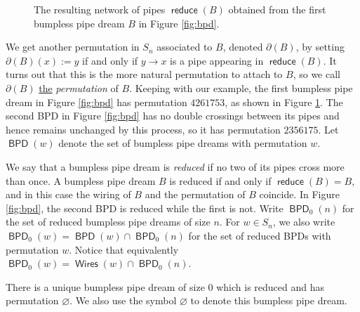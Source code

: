\documentclass[11pt]{article}
\makeatletter
\theoremstyle{definition}
\numberwithin{equation}{section}
\DeclareMathOperator{\reduce}{\mathsf{reduce}}
\DeclareMathOperator{\Wires}{\mathsf{Wires}}
\DeclareMathOperator{\BPD}{\mathsf{BPD}}
\newcommand{\pipecolor}{UForange}
\newcommand{\drawHorizontal}[2]{
    \draw[color=\pipecolor,very thick]
    (#1-0.5,#2) to (#1+0.5,#2);
}
\newcommand{\drawVertical}[2]{
    \draw[color=\pipecolor,very thick]
    (#1,#2-0.5) to (#1,#2+0.5);
}
\newcommand{\drawCross}[2]{
    \drawHorizontal{#1}{#2}
    \drawVertical{#1}{#2}
}
\newcommand{\drawRelbow}[2]{
    \draw[color=\pipecolor,very thick]
    (#1,#2-0.5) to (#1,#2-0.25) to[bend left] (#1+0.25,#2) to (#1+0.5,#2);
}
\newcommand{\drawJelbow}[2]{
    \draw[color=\pipecolor,very thick]
    (#1,#2+0.5) to (#1,#2+0.25) to[bend left] (#1-0.25,#2) to (#1-0.5,#2);
}
\newcommand{\drawBump}[2]{
    \drawRelbow{#1}{#2}
    \drawJelbow{#1}{#2}
}
\newcommand{\drawBPDTile}[3]{
    \ifnum #3=1 \drawVertical{#1}{#2}   \fi
    \ifnum #3=2 \drawHorizontal{#1}{#2} \fi
    \ifnum #3=3 \drawCross{#1}{#2}      \fi
    \ifnum #3=4 \drawRelbow{#1}{#2}     \fi
    \ifnum #3=5 \drawJelbow{#1}{#2}     \fi
    \ifnum #3=6 \drawBump{#1}{#2}       \fi
}
\newcommand{\drawBPD}[4]
{
    \draw[
        step=1.0,xshift=-0.5cm,yshift=0.5cm,
        black,opacity=0.5,thin
    ] (#1,#2) grid (#1+#3,#2-#3);
    
    \BPD@i = 0
    \BPD@j = 0
    \foreach \t in {#4}{
        \drawBPDTile{#1+\number\BPD@j}{#2-\number\BPD@i}{\t}
        \ifnum\BPD@j < \numexpr#3-1\relax
            \global\advance\BPD@j by 1
        \else
            \global\BPD@j = 0
            \global\advance\BPD@i by 1
        \fi
    }
}
\newcommand{\drawLabels}[4]
{
    \foreach \i\w in {#4}{
        \node at (#1+\i-1,#2-#3) {\i};
        \node at (#1+#3,#2+1-\i) {\w};
    }
}
\newcommand{\drawBPDwithL}[5]
{
    \drawBPD{#1}{#2}{#3}{#4}
    \drawLabels{#1}{#2}{#3}{#5}
}
\makeatother
\begin{document}
\begin{figure}
    \centering

    
    \caption{The resulting network of pipes $\reduce(B)$ obtained from the first bumpless pipe dream $B$ in Figure \ref{fig:bpd}.}
    \label{fig:bpd_K}
\end{figure}

We get another permutation in $S_n$ associated to $B$, denoted $\partial(B)$, by setting $\partial(B)(x) := y$ if and only if $y\to x$ is a pipe appearing in $\reduce(B)$.
It turns out that this is the more natural permutation to attach to $B$, so we call $\partial(B)$ \underline{the} \textit{permutation} of $B$.
Keeping with our example, the first bumpless pipe dream in Figure \ref{fig:bpd} has permutation $4261753$, as shown in Figure \ref{fig:bpd_K}.
The second BPD in Figure \ref{fig:bpd} has no double crossings between its pipes and hence remains unchanged by this process, so it has permutation $2356175$.
Let $\BPD(w)$ denote the set of bumpless pipe dreams with permutation $w$.

We say that a bumpless pipe dream is \textit{reduced} if no two of its pipes cross more than once.
A bumpless pipe dream $B$ is reduced if and only if $\reduce(B) = B$, and in this case the wiring of $B$ and the permutation of $B$ coincide.
In Figure \ref{fig:bpd}, the second BPD is reduced while the first is not.
Write $\BPD_0(n)$ for the set of reduced bumpless pipe dreams of size $n$.
For $w\in S_n$, we also write $\BPD_0(w) = \BPD(w)\cap \BPD_0(n)$ for the set of reduced BPDs with permutation $w$.
Notice that equivalently $\BPD_0(w) = \Wires(w)\cap \BPD_0(n)$.

There is a unique bumpless pipe dream of size $0$ which is reduced and has permutation $\varnothing$.
We also use the symbol $\varnothing$ to denote this bumpless pipe dream.
\end{document}
